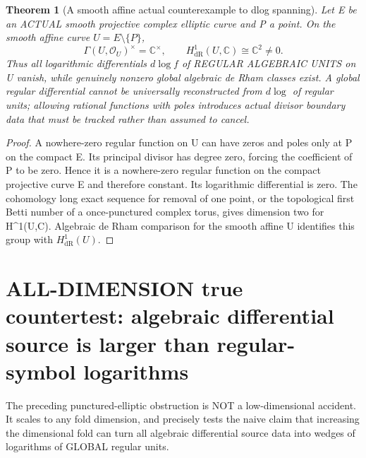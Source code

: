 \documentclass[11pt]{article}
\newtheorem{theorem}{Theorem}[section]
\begin{document}
\begin{theorem}[A smooth affine actual counterexample to dlog spanning]
Let E be an ACTUAL smooth projective complex
elliptic curve and P a point.
On the smooth affine curve $U=E\setminus\{P\}$,
\[
 \boxed{
 \Gamma(U,\mathcal O_U)^\times=\mathbb C^\times,
 \qquad H^1_{\mathrm{dR}}(U,\mathbb C)
                      \cong\mathbb C^2\ne0.
 }                                                       \tag{15}
\]
Thus all logarithmic differentials
$d\log f$ of REGULAR ALGEBRAIC UNITS on U vanish,
while genuinely nonzero global algebraic de Rham
classes exist. A global regular differential
cannot be universally reconstructed from
$d\log$ of regular units; allowing rational
functions with poles introduces actual divisor
boundary data that must be tracked rather than
assumed to cancel.
\end{theorem}
\begin{proof}
A nowhere-zero regular function on U can have
zeros and poles only at P on the compact E.
Its principal divisor has degree zero, forcing
the coefficient of P to be zero. Hence it is
a nowhere-zero regular function on the
compact projective curve E and therefore
constant. Its logarithmic differential is zero.
The cohomology long exact sequence for removal
of one point, or the topological first Betti
number of a once-punctured complex torus,
gives dimension two for H^1(U,C).
Algebraic de Rham comparison for the smooth
affine U identifies this group with
$H^1_{\mathrm{dR}}(U)$.
\end{proof}

\section{ALL-DIMENSION true countertest: algebraic differential source is larger than regular-symbol logarithms}
The preceding punctured-elliptic obstruction is NOT
a low-dimensional accident. It scales to any
fold dimension, and precisely tests the naive
claim that increasing the dimensional fold can
turn all algebraic differential source data into
wedges of logarithms of GLOBAL regular units.
\end{document}

